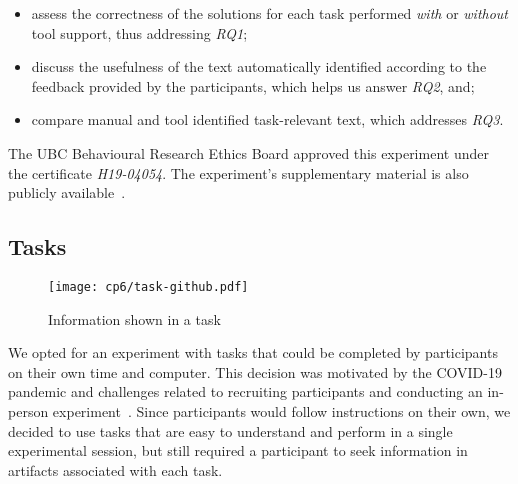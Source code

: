 \begin{itemize}
    \item assess the correctness of the solutions for each task performed \textit{with} or \textit{without} tool support, thus addressing \textit{RQ1};
     
    \item discuss the usefulness of the text automatically identified  according to the feedback provided by the participants, which helps us answer \textit{RQ2}, and;

    \item compare manual and tool identified task-relevant text, which addresses \textit{RQ3}. 
\end{itemize}
 







The \acs{UBC} Behavioural Research Ethics Board approved this experiment under the certificate \textit{H19-04054}.
The experiment's supplementary material is also publicly available~\cite{dspython}.



\subsection{Tasks}
\label{cp6:tasks}



\begin{figure}
    \centering
    \texttt{[image: cp6/task-github.pdf]}
    \caption{Information shown in a task}
    \label{fig:nytimes-task-github}
\end{figure}



We opted for an experiment with tasks that could be completed by participants on their own time and computer.
This decision was motivated by the COVID-19 pandemic and challenges related to recruiting participants and conducting an in-person experiment~\cite{russo2021a, russo2021b}. 
Since participants would follow instructions on their own, we decided to use tasks that are easy to understand and perform in a single experimental session, but still required a participant  
to seek information in artifacts associated with each task.


